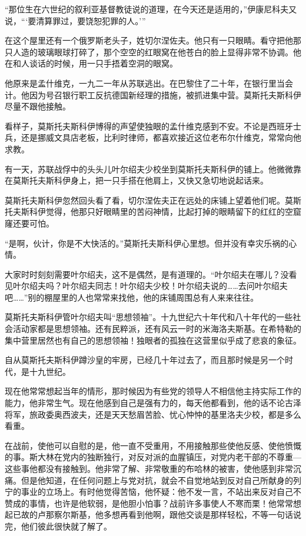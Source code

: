 “那位生在六世纪的叙利亚基督教徒说的道理，在今天还是适用的，”伊康尼科夫又说，“‘要清算罪过，要饶恕犯罪的人。’”

在这个屋里还有一个俄罗斯老头子，姓切尔涅佐夫。他只有一只眼睛。看守把他那只人造的玻璃眼球打碎了，那个空空的红眼窝在他苍白的脸上显得非常不协调。他在和人谈话的时候，用一只手捂着空洞的眼窝。

他原来是孟什维克，一九二一年从苏联逃出。在巴黎住了二十年，在银行里当会计。他因为号召银行职工反抗德国新经理的措施，被抓进集中营。莫斯托夫斯科伊尽量不跟他接触。

看样子，莫斯托夫斯科伊博得的声望使独眼的孟什维克感到不安。不论是西班牙士兵，还是挪威文具店老板，比利时律师，都喜欢接近这位老布尔什维克，常常向他求教。

有一天，苏联战俘中的头头儿叶尔绍夫少校坐到莫斯托夫斯科伊的铺上。他微微靠在莫斯托夫斯科伊身上，把一只手搭在他肩上，又快又急切地说起话来。

莫斯托夫斯科伊忽然回头看了看，切尔涅佐夫正在远处的床铺上望着他们呢。莫斯托夫斯科伊觉得，他那只好眼睛里的苦闷神情，比起打掉的眼睛留下的红红的空窟窿还要可怕。

“是啊，伙计，你是不大快活的。”莫斯托夫斯科伊心里想。但并没有幸灾乐祸的心情。

大家时时刻刻需要叶尔绍夫，这不是偶然，是有道理的。“叶尔绍夫在哪儿？没看见叶尔绍夫吗？叶尔绍夫同志！叶尔绍夫少校！叶尔绍夫说的……去问叶尔绍夫吧……”别的棚屋里的人也常常来找他，他的床铺周围总有人来来往往。

莫斯托夫斯科伊管叶尔绍夫叫“思想领袖”。十九世纪六十年代和八十年代的一些社会活动家都是思想领袖。还有民粹派，还有风云一时的米海洛夫斯基。在希特勒的集中营里居然也有自己的思想领袖！独眼者的孤独在这营里似乎成了悲哀的象征。

自从莫斯托夫斯科伊蹲沙皇的牢房，已经几十年过去了，而且那时候是另一个时代，是十九世纪。

现在他常常想起当年的情形，那时候因为有些党的领导人不相信他主持实际工作的能力，他非常生气。现在他感到自己是强有力的，每天他都看到，他的话不论古泽将军，旅政委奥西波夫，还是天天愁眉苦脸、忧心忡忡的基里洛夫少校，都是多么看重。

在战前，使他可以自慰的是，他一直不受重用，不用接触那些使他反感、使他愤慨的事。斯大林在党内的独断独行，对反对派的血腥镇压，对党内老干部的不尊重—这些事他都没有接触到。他非常了解、非常敬重的布哈林的被害，使他感到非常沉痛。但是他知道，在任何问题上与党对抗，就会不自觉地站到反对自己所献身的列宁的事业的立场上。有时他觉得苦恼，他怀疑：他不发一言，不站出来反对自己不赞成的事情，也许是他软弱，是他胆小怕事？战前许多事使人不寒而栗！他常常想起已故的卢那察尔斯基，他多想再看到他啊，跟他交谈是那样轻松，不等一句话说完，他们彼此很快就了解了。


